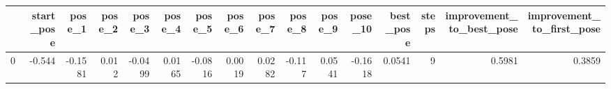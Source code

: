 \begin{tabular}{lrrrrrrrrrrrrrrr}
\toprule
{} &  start\_pose &  pose\_1 &  pose\_2 &  pose\_3 &  pose\_4 &  pose\_5 &  pose\_6 &  pose\_7 &  pose\_8 &  pose\_9 &  pose\_10 &  best\_pose &  steps &  improvement\_to\_best\_pose &  improvement\_to\_first\_pose \\
\midrule
0 &      -0.544 & -0.1581 &   0.012 & -0.0499 &  0.0165 & -0.0816 &  0.0019 &  0.0282 &  -0.117 &  0.0541 &  -0.1618 &     0.0541 &      9 &                    0.5981 &                     0.3859 \\
\bottomrule
\end{tabular}
